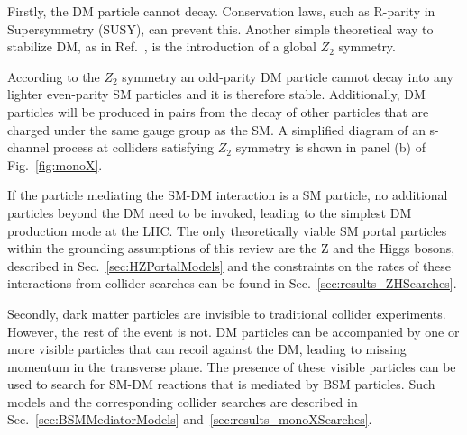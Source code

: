 Firstly, the DM particle cannot decay. Conservation laws, such as R-parity in Supersymmetry (SUSY), can prevent this. Another simple theoretical way to stabilize DM, as in Ref.~\cite{Batell:2010bp}, is the introduction of a global $Z_2$ symmetry. 
\begin{marginnote}[]
\end{marginnote}
According to the $Z_2$ symmetry an odd-parity DM particle cannot decay into any lighter even-parity SM particles and it is therefore stable. 
Additionally, DM particles will be produced in pairs from the decay of other particles that are charged under the same gauge group as the SM.
A simplified diagram of an s-channel process at colliders satisfying $Z_2$ symmetry is shown in panel (b) of Fig.~\ref{fig:monoX}.


If the particle mediating the SM-DM interaction is a SM particle, no additional particles beyond the DM need to be invoked, leading to the simplest DM production mode at the LHC. The only theoretically viable SM portal particles within the grounding assumptions of this review are the Z and the Higgs bosons, described in Sec.~\ref{sec:HZPortalModels} and the constraints on the rates of these interactions from collider searches can be found in Sec.~\ref{sec:results_ZHSearches}. 

Secondly, dark matter particles are invisible to traditional collider experiments. However, the rest of the event is not. DM particles can be accompanied by one or more visible particles that can recoil against the DM, leading to missing momentum in the transverse plane. The presence of these visible particles can be used to search for SM-DM reactions that is mediated by BSM particles. Such models and the corresponding collider searches are described in Sec.~\ref{sec:BSMMediatorModels} and~\ref{sec:results_monoXSearches}. 

\begin{marginnote}[]
\end{marginnote}

